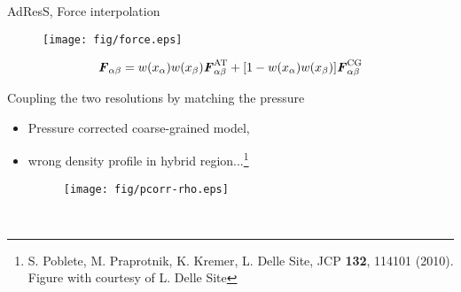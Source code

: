 \documentclass{beamer}
\newcommand{\redc}[1]{{\color{red} #1}}
\newcommand{\bluec}[1]{{\color{blue} #1}}
\newcommand{\vect}[1]{\textbf{\textit{#1}}}
\newcommand{\AT}{{\textrm{{AT}}}}
\newcommand{\CG}{{\textrm{CG}}}
\begin{document}
\begin{frame}{AdResS, Force interpolation}
  \begin{figure}
    \centering 
    \texttt{[image: fig/force.eps]}
  \end{figure}
  \begin{equation*}
    {\vect F}_{\alpha \beta}=w(x_\alpha)w(x_\beta){\vect F}_{\alpha\beta}^{\AT}+[1-w(x_\alpha)w(x_\beta)]{\vect F}^{\CG}_{\alpha\beta}
  \end{equation*}
\end{frame} 





\begin{frame}{Coupling the two resolutions by matching the pressure}
  \begin{itemize}
  \item 
    Pressure corrected coarse-grained model,\\
  \item 
    \bluec{wrong density profile in hybrid region...\footnote{
      S. Poblete, M. Praprotnik, K. Kremer, L. Delle Site, JCP \textbf{132}, 114101 (2010). Figure
      with courtesy of L. Delle Site
    }}
    \begin{minipage}[t]{0.78\linewidth}
      \begin{figure}
        \texttt{[image: fig/pcorr-rho.eps]}\hfill
      \end{figure}
    \end{minipage}\\
  \end{itemize}
\end{frame}
\end{document}

